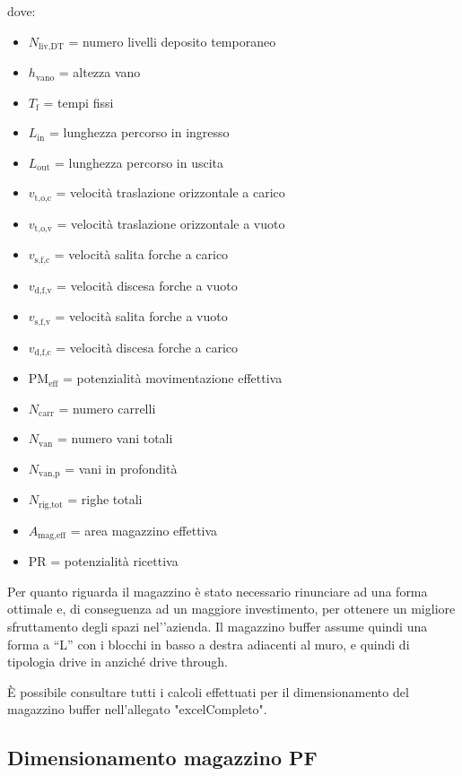 \documentclass[11pt]{article}
\begin{document}
dove:
\begin{itemize}
    \item $N_{\text{liv,DT}}$ = numero livelli deposito temporaneo
    \item $h_{\text{vano}}$ = altezza vano
    \item $T_{\text{f}}$ = tempi fissi
    \item $L_{\text{in}}$ = lunghezza percorso in ingresso
    \item $L_{\text{out}}$ = lunghezza percorso in uscita
    \item $v_{\text{t,o,c}}$ = velocità traslazione orizzontale a carico
    \item $v_{\text{t,o,v}}$ = velocità traslazione orizzontale a vuoto
    \item $v_{\text{s,f,c}}$ = velocità salita forche a carico
    \item $v_{\text{d,f,v}}$ = velocità discesa forche a vuoto
    \item $v_{\text{s,f,v}}$ = velocità salita forche a vuoto
    \item $v_{\text{d,f,c}}$ = velocità discesa forche a carico
    \item $\text{PM}_{\text{eff}}$ = potenzialità movimentazione effettiva
    \item $N_{\text{carr}}$ = numero carrelli
    \item $N_{\text{van}}$ = numero vani totali
    \item $N_{\text{van,p}}$ = vani in profondità
    \item $N_{\text{rig,tot}}$ = righe totali
    \item $A_{\text{mag,eff}}$ = area magazzino effettiva
    \item $\text{PR}$ = potenzialità ricettiva
\end{itemize}

\newpage
Per quanto riguarda il magazzino è stato necessario rinunciare ad una forma ottimale e, di conseguenza ad un maggiore investimento, per ottenere un migliore sfruttamento degli spazi nel'’azienda. Il magazzino buffer assume quindi una forma a “L” con i blocchi in basso a destra adiacenti al muro, e quindi di tipologia drive in anziché drive through.

È possibile consultare tutti i calcoli effettuati per il dimensionamento del magazzino buffer nell'allegato "{{excelCompleto}}".
\newpage

\subsection{Dimensionamento magazzino PF}
\end{document}
